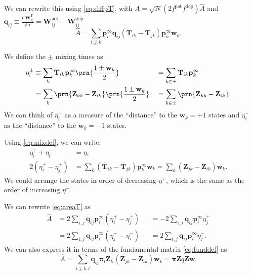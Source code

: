 \documentclass[9pt,twocolumn,twoside,lineno]{pnas-new}
\newcommand{\diff}[3][]{\frac{\mathrm{d}^{#1} #2}{\mathrm{d}{#3}^{#1}}}
\newcommand{\prob}{\mathbf{p}}
\newcommand{\eq}{\prob^\infty}
\newcommand{\fpt}{\mathbf{T}}
\newcommand{\fptb}{\overline{\fpt}}
\newcommand{\fund}{\mathbf{Z}}
\newcommand{\pib}{\boldsymbol{\pi}}
\newcommand{\w}{\mathbf{w}}
\newcommand{\W}{\mathbf{W}}
\newcommand{\enc}{\mathbf{q}}
\newcommand{\frg}{\W^{\mathrm{F}}}
\newcommand{\pot}{^{\text{pot}}}
\newcommand{\dep}{^{\text{dep}}}
\begin{document}
\begin{strip}
We can rewrite this using \cref{eq:diffpT}, with $A=\sqrt{N}(2f\pot f\dep )\hat{A}$ and $\enc_{ij} \equiv \diff{\frg_{ij}}{\alpha}=\W\pot _{ij}-\W\dep _{ij}$
%
\begin{equation}\label{eq:areaT}
  \hat{A} = \sum_{i,j,k} \eq_i \enc_{ij} (\fptb_{ik} - \fptb_{jk}) \eq_k \w_k.
\end{equation}
%

\begin{defn}
We define the $\pm$ mixing times as
%
\begin{equation}\label{eq:mixingpm}
\begin{aligned}
  \eta^\pm_i &\equiv \sum_k \fptb_{ik} \eq_k \prn{\frac{1 \pm \w_k}{2}}
    &&= \sum_{k\in\pm} \fptb_{ik} \eq_k \\
    &= \sum_k \prn{\fund_{kk}-\fund_{ik}} \prn{\frac{1 \pm \w_k}{2}}
    &&= \sum_{k\in\pm} \prn{\fund_{kk}-\fund_{ik}} .
\end{aligned}
\end{equation}
%
We can think of $\eta^+_i$ as a measure of the ``distance'' to the $\w_k=+1$ states and $\eta^-_i$ as the ``distance'' to the $\w_k=-1$ states.
\end{defn}
Using \cref{eq:mixdef}, we can write:
%
\begin{equation}\label{eq:mixingrels}
\begin{aligned}
  \eta^+_i + \eta^-_i &= \eta,\\
  2(\eta^+_i - \eta^+_j) &= \sum_k (\fptb_{ik}-\fptb_{jk}) \eq_k \w_k
    = \sum_k (\fund_{jk}-\fund_{ik}) \w_k.
\end{aligned}
\end{equation}
%
We could arrange the states in order of decreasing $\eta^+$, which is the same as the order of increasing $\eta^-$.

We can rewrite \cref{eq:areaT} as
%
\begin{equation}\label{eq:areaEta:s}
\begin{aligned}
  \hat{A} &= 2\sum_{i,j} \enc_{ij} \eq_i (\eta^+_{i} - \eta^+_{j}) &
    &= -2\sum_{i,j} \enc_{ij} \eq_i \eta^+_{j} \\
    &= 2\sum_{i,j} \enc_{ij} \eq_i (\eta^-_{j} - \eta^-_{i}) &
    &= 2\sum_{i,j} \enc_{ij} \eq_i \eta^-_{j}.
\end{aligned}
\end{equation}
%
We can also express it in terms of the fundamental matrix \cref{eq:funddef} as
%
\begin{equation}\label{eq:areaZ}
  \hat{A} = \sum_{i,j,k,l} \enc_{ij} \pib_{l} \fund_{li} (\fund_{jk}-\fund_{ik}) \w_k
    = \pib \fund q \fund \w.
\end{equation}
%


\end{strip}
\end{document}
